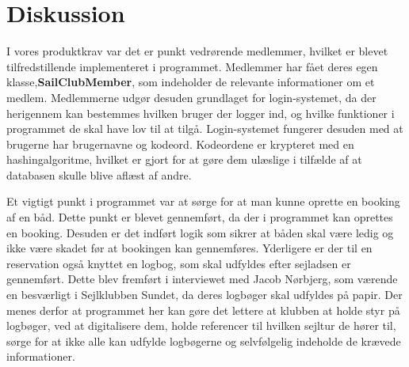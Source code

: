 \chapter{Diskussion}
I vores produktkrav var det er punkt vedrørende medlemmer, hvilket er blevet tilfredstillende implementeret i programmet. Medlemmer har fået deres egen klasse,\textbf{SailClubMember}, som indeholder de relevante informationer om et medlem. Medlemmerne udgør desuden grundlaget for login-systemet, da der herigennem kan bestemmes hvilken bruger der logger ind, og hvilke funktioner i programmet de skal have lov til at tilgå. Login-systemet fungerer desuden med at brugerne har brugernavne og kodeord. Kodeordene er krypteret med en hashingalgoritme, hvilket er gjort for at gøre dem ulæslige i tilfælde af at databasen skulle blive aflæst af andre. 

Et vigtigt punkt i programmet var at sørge for at man kunne oprette en booking af en båd. Dette punkt er blevet gennemført, da der i programmet kan oprettes en booking. Desuden er det indført logik som sikrer at båden skal være ledig og ikke være skadet før at bookingen kan gennemføres. Yderligere er der til en reservation også knyttet en logbog, som skal udfyldes efter sejladsen er gennemført. Dette blev fremført i interviewet med Jacob Nørbjerg, som værende en besværligt i Sejlklubben Sundet, da deres logbøger skal udfyldes på papir. Der menes derfor at programmet her kan gøre det lettere at klubben at holde styr på logbøger, ved at digitalisere dem, holde referencer til hvilken sejltur de hører til, sørge for at ikke alle kan udfylde logbøgerne og selvfølgelig indeholde de krævede informationer. 